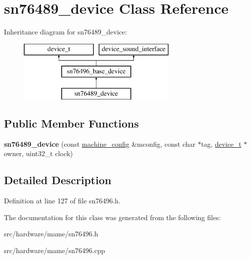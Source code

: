 \hypertarget{classsn76489__device}{\section{sn76489\-\_\-device Class Reference}
\label{classsn76489__device}
}
Inheritance diagram for sn76489\-\_\-device\-:\begin{figure}[H]
\begin{center}
\leavevmode
\includegraphics[height=3.000000cm]{classsn76489__device}
\end{center}
\end{figure}
\subsection*{Public Member Functions}
\begin{DoxyCompactItemize}
\item 
\hypertarget{classsn76489__device_a1af1b677c2d095615c05fa03d4c3d55b}{{\bfseries sn76489\-\_\-device} (const \hyperlink{structmachine__config}{machine\-\_\-config} \&mconfig, const char $\ast$tag, \hyperlink{classdevice__t}{device\-\_\-t} $\ast$owner, uint32\-\_\-t clock)}\label{classsn76489__device_a1af1b677c2d095615c05fa03d4c3d55b}

\end{DoxyCompactItemize}


\subsection{Detailed Description}


Definition at line 127 of file sn76496.\-h.



The documentation for this class was generated from the following files\-:\begin{DoxyCompactItemize}
\item 
src/hardware/mame/sn76496.\-h\item 
src/hardware/mame/sn76496.\-cpp\end{DoxyCompactItemize}
